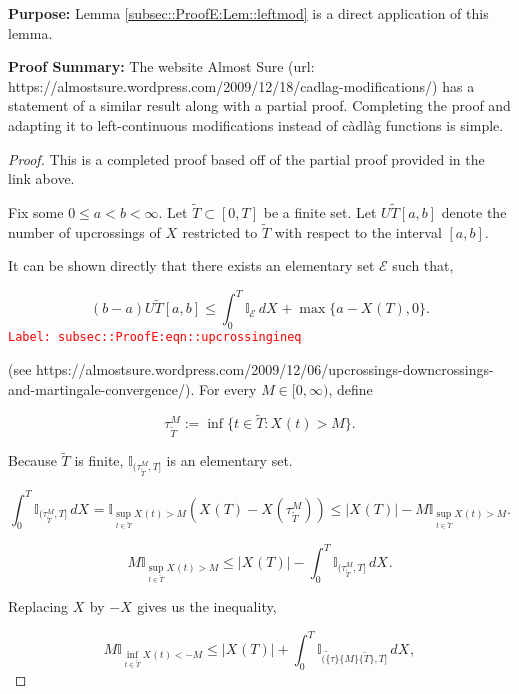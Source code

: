\documentclass[12pt]{article}
\newcommand{\mb}{\mathbb}
\newcommand{\mc}{\mathcal}
\newcommand{\tr}{\textcolor{red}}
\newcommand{\labe}[1]{\tr{\texttt{Label: #1}}}
\newcommand{\purpose}{\textbf{Purpose: }}
\newcommand{\pfsum}{\textbf{Proof Summary: }}
\newcommand{\ind}{\hspace{24pt}}
\newcommand{\T}{T}								%
\renewcommand{\t}{t}							%
\newcommand{\X}{X}								%
\newcommand{\cind}[1]{_{#1}}					%
\newcommand{\tp}[1]{(#1)}						%
\newcommand{\tip}[1]{#1}						%
\newcommand{\alt}[1]{\widetilde{#1}}			%
\newcommand{\rt}{\tau}							%
\newcommand{\evnt}{\mc{E}}						%
\newcommand{\Tset}{\alt{T}}						%
\newcommand{\upcrs}{U}							%
\newcommand{\gid}[1]{^{#1}}						%
\newcommand{\gidd}[1]{_{#1}}					%
\begin{document}
\purpose Lemma \ref{subsec::ProofE:Lem::leftmod} is a direct application of this lemma.

\pfsum The website Almost Sure (url: https://almostsure.wordpress.com/2009/12/18/cadlag-modifications/) has a statement of a similar result along with a partial proof. Completing the proof and adapting it to left-continuous modifications instead of c\`adl\`ag functions is simple.

\begin{proof}
This is a completed proof based off of the partial proof provided in the link above.

\ind Fix some \(0\leq a < b < \infty\). Let \(\Tset \subset [0,\T]\) be a finite set. Let \(\upcrs{\alt{\T}}[a,b]\) denote the number of upcrossings of \(\X\cind{}\tip{}\) restricted to \(\alt{\T}\) with respect to the interval \([a,b]\).

\ind It can be shown directly that there exists an elementary set \(\evnt{}\) such that,

\begin{equation}
(b-a)\upcrs{\Tset}[a,b] \leq \int_0^\T \mb{I}_{\evnt}\,d\X\cind{}\tip{} + \max\{a - \X\cind{}\tp{\T},0\}.
\label{subsec::ProofE:eqn::upcrossingineq}
\end{equation}
\labe{subsec::ProofE:eqn::upcrossingineq}

(see https://almostsure.wordpress.com/2009/12/06/upcrossings-downcrossings-and-martingale-convergence/). For every \(M \in [0,\infty)\), define

\[\rt\gid{M}\gidd{\Tset} := \inf\{\t\in \alt{\T}: \X\cind{}\tp{\t} > M\}.\]

Because \(\Tset\) is finite, \(\mb{I}_{(\rt\gid{M}\gidd{\Tset},\T]}\) is an elementary set.

\[\int_0^\T \mb{I}_{(\rt\gid{M}\gidd{\Tset},\T]}\,d\X\cind{}\tip{} = \mb{I}_{\sup_{\t\in \Tset} \X\cind{}\tp{\t} > M}(\X\cind{}\tp{\T} - \X\cind{}\tp{\rt\gid{M}\gidd{\Tset}}) \leq |\X\cind{}\tp{\T}| - M\mb{I}_{\sup_{\t \in \Tset} \X\cind{}\tp{\t} > M}.\]

\[M\mb{I}_{\sup_{\t\in\Tset} \X\cind{}\tp{\t} > M} \leq |\X\cind{}\tp{\T}| - \int_0^T \mb{I}_{(\rt\gid{M}\gidd{\Tset},\T]}\,d\X\cind{}\tip{}.\]


Replacing \(\X\cind{}\tip{}\) by \(-\X\cind{}\tip{}\) gives us the inequality,

\[M\mb{I}_{\inf_{\t\in\Tset} \X\cind{}\tp{\t} < -M} \leq |\X\cind{}\tp{\T}| + \int_0^T \mb{I}_{(\alt\{\rt\}\{M\}\{\Tset\},\T]}\,d\X\cind{}\tip{},\]


\end{proof}
\end{document}
